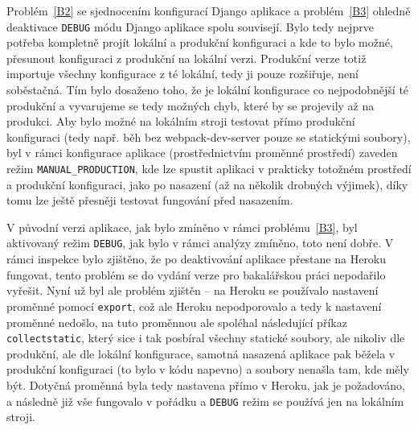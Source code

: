 Problém~\ref{B2} se sjednocením konfigurací Django aplikace a problém~\ref{B3} ohledně deaktivace \verb|DEBUG| módu Django aplikace spolu souvisejí. Bylo tedy nejprve potřeba kompletně projít lokální a produkční konfiguraci a kde to bylo možné, přesunout konfiguraci z produkční na lokální verzi. Produkční verze totiž importuje všechny konfigurace z té lokální, tedy ji pouze rozšiřuje, není soběstačná. Tím bylo dosaženo toho, že je lokální konfigurace co nejpodobnější té produkční a vyvarujeme se tedy možných chyb, které by se projevily až na produkci. Aby bylo možné na lokálním stroji testovat přímo produkční konfiguraci (tedy např. běh bez webpack-dev-server pouze se statickými soubory), byl v rámci konfigurace aplikace (prostřednictvím proměnné prostředí) zaveden režim \verb|MANUAL_PRODUCTION|, kde lze spustit aplikaci v prakticky totožném prostředí a produkční konfiguraci, jako po nasazení (až na několik drobných výjimek), díky tomu lze ještě přesněji testovat fungování před nasazením. 

V původní verzi aplikace, jak bylo zmíněno v rámci problému~\ref{B3}, byl aktivovaný režim \verb|DEBUG|, jak bylo v rámci analýzy zmíněno, toto není dobře. V rámci inspekce bylo zjištěno, že po deaktivování aplikace přestane na Heroku fungovat, tento problém se do vydání verze pro bakalářskou práci nepodařilo vyřešit. Nyní už byl ale problém zjištěn -- na Heroku se používalo nastavení proměnné pomocí \verb|export|, což ale Heroku nepodporovalo a tedy k nastavení proměnné nedošlo, na tuto proměnnou ale spoléhal následující příkaz \verb|collectstatic|, který sice i tak posbíral všechny statické soubory, ale nikoliv dle produkční, ale dle lokální konfigurace, samotná nasazená aplikace pak běžela v produkční konfiguraci (to bylo v kódu napevno) a soubory nenašla tam, kde měly být. Dotyčná proměnná byla tedy nastavena přímo v Heroku, jak je požadováno, a následně již vše fungovalo v pořádku a \verb|DEBUG| režim se používá jen na lokálním stroji.

